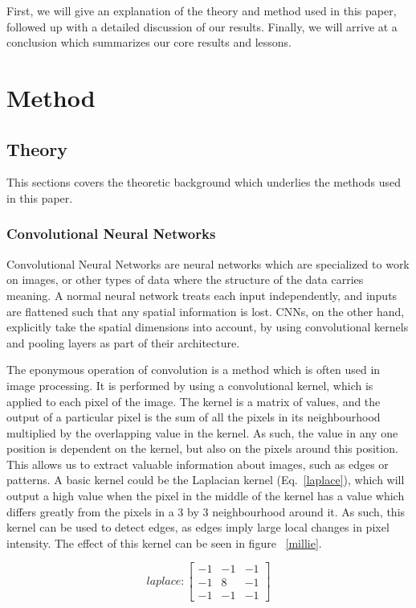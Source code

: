\documentclass[onecolumn,10pt,cleanfoot]{asme2ej}
\begin{document}
First, we will give an explanation of the theory and method used in this paper, followed up with a detailed discussion of our results. Finally, we will arrive at a conclusion which summarizes our core results and lessons.

\section{Method}

\subsection{Theory}

This sections covers the theoretic background which underlies the methods used in this paper.

\subsubsection{Convolutional Neural Networks}

Convolutional Neural Networks are neural networks which are specialized to work on images, or other types of data where the structure of the data carries meaning. A normal neural network treats each input independently, and inputs are flattened such that any spatial information is lost. CNNs, on the other hand, explicitly take the spatial dimensions into account, by using convolutional kernels and pooling layers as part of their architecture.

The eponymous operation of convolution is a method which is often used in image processing. It is performed by using a convolutional kernel, which is applied to each pixel of the image. The kernel is a matrix of values, and the output of a particular pixel is the sum of all the pixels in its neighbourhood multiplied by the overlapping value in the kernel. As such, the value in any one position is dependent on the kernel, but also on the pixels around this position. This allows us to extract valuable information about images, such as edges or patterns. A basic kernel could be the Laplacian kernel (Eq.~\ref{laplace}), which will output a high value when the pixel in the middle of the kernel has a value which differs greatly from the pixels in a 3 by 3 neighbourhood around it. As such, this kernel can be used to detect edges, as edges imply large local changes in pixel intensity. The effect of this kernel can be seen in figure ~\ref{millie}.

\begin{equation}
\label{laplace}
laplace : 
\begin{bmatrix}
-1 & -1 & -1 \\
-1 & 8 & -1 \\
-1 & -1 & -1
\end{bmatrix}
\end{equation}
\end{document}
